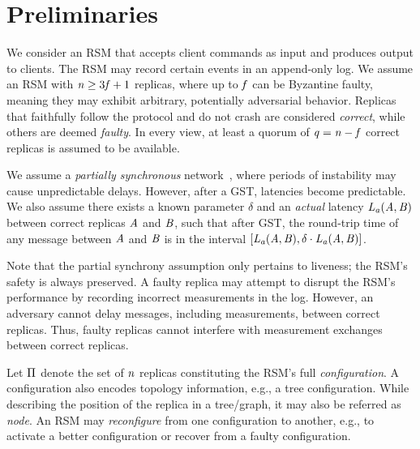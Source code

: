 \section{Preliminaries}
\label{sec:prelim}

We consider an \ac{RSM} that accepts client commands as input and produces output to clients.
The RSM may record certain events in an append-only log.
We assume an RSM with $\n\ge3\f+1$ replicas, where up to $\f$ can be Byzantine faulty, meaning they may exhibit arbitrary, potentially adversarial behavior.
Replicas that faithfully follow the protocol and do not crash are considered \textit{correct}, while others are deemed \textit{faulty}.
In every view, at least a quorum of $\q=\n-\f$ correct replicas is assumed to be available.

We assume a \textit{partially synchronous} network~\cite{partialsynchronous}, where periods of instability may cause unpredictable delays.
However, after a \ac{GST}, latencies become predictable.
We also assume there exists a known parameter $\delta$ and an \textit{actual} latency $\lat[a]{\na}{\nb}$ between correct replicas $\na$ and $\nb$, such that after GST, the round-trip time of any message between $\na$ and $\nb$ is in the interval $[\lat[a]{\na}{\nb}, \delta\cdot\lat[a]{\na}{\nb}]$.

Note that the partial synchrony assumption only pertains to liveness; the RSM's safety is always preserved.
A faulty replica may attempt to disrupt the RSM's performance by recording incorrect measurements in the log.
However, an adversary cannot delay messages, including measurements, between correct replicas.
Thus, faulty replicas cannot interfere with measurement exchanges between correct replicas.

Let $\C{}$ denote the set of $\n$ replicas constituting the RSM's full \textit{configuration}.
A configuration also encodes topology information, e.g., a tree configuration.
While describing the position of the replica in a tree/graph, it may also be referred as \textit{node}.
An RSM may \textit{reconfigure} from one configuration to another, e.g., to activate a better configuration or recover from a faulty configuration.
